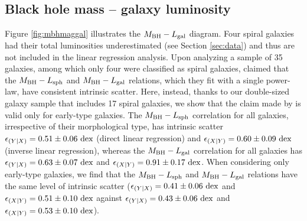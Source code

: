 \documentclass[preprint2]{emulateapj}
\begin{document}
\subsection{Black hole mass -- galaxy luminosity}
Figure \ref{fig:mbhmaggal} illustrates the $M_{\rm BH} - L_{\rm gal}$ diagram.
Four spiral galaxies had their total luminosities underestimated (see Section \ref{sec:data}) 
and thus are not included in the linear regression analysis. 
Upon analyzing a sample of 35 galaxies, among which only four were classified as spiral galaxies, 
\cite{lasker2014anal} claimed that the $M_{\rm BH} - L_{\rm sph}$ and $M_{\rm BH} - L_{\rm gal}$ relations, 
which they fit with a single power-law, have consistent intrinsic scatter.
Here, instead, thanks to our double-sized galaxy sample that includes 17 spiral galaxies, 
we show that the claim made by \cite{lasker2014anal} is valid only for early-type galaxies. 
The $M_{\rm BH} - L_{\rm sph}$ correlation for all galaxies, irrespective of their morphological type, 
has intrinsic scatter $\epsilon_{(Y|X)} = 0.51 \pm 0.06\rm~dex$ (direct linear regression) 
and $\epsilon_{(X|Y)} = 0.60 \pm 0.09\rm~dex$ (inverse linear regression), 
whereas the $M_{\rm BH} - L_{\rm gal}$ correlation for all galaxies has $\epsilon_{(Y|X)} = 0.63 \pm 0.07\rm~dex$ 
and $\epsilon_{(X|Y)} = 0.91 \pm 0.17\rm~dex$.
When considering only early-type galaxies, 
we find that the $M_{\rm BH} - L_{\rm sph}$ and $M_{\rm BH} - L_{\rm gal}$ relations have the same level of intrinsic scatter 
($\epsilon_{(Y|X)} = 0.41 \pm 0.06\rm~dex$ and $\epsilon_{(X|Y)} = 0.51 \pm 0.10\rm~dex$ 
against $\epsilon_{(Y|X)} = 0.43 \pm 0.06\rm~dex$ and $\epsilon_{(X|Y)} = 0.53 \pm 0.10\rm~dex$).
\end{document}
